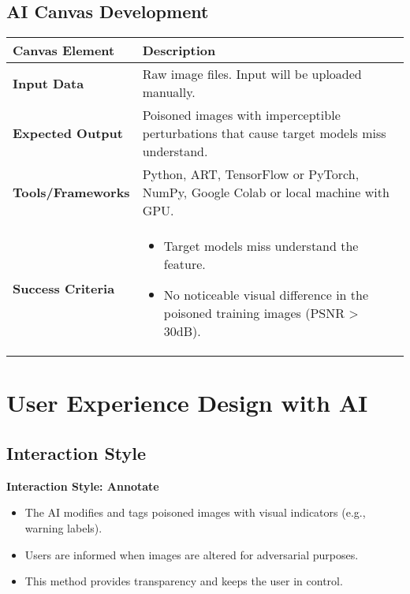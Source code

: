 \subsection{AI Canvas Development}

\begin{table}[h]
\centering
\begin{tabular}{|p{4cm}|p{10cm}|}
\hline
\textbf{Canvas Element} & \textbf{Description} \\
\hline
\textbf{Input Data} & Raw image files. Input will be uploaded manually. \\
\hline
\textbf{Expected Output} & Poisoned images with imperceptible perturbations that cause target models miss understand. \\
\hline
\textbf{Tools/Frameworks} & Python, ART, TensorFlow or PyTorch, NumPy, Google Colab or local machine with GPU. \\
\hline
\textbf{Success Criteria} & 
\begin{itemize}
    \item Target models miss understand the feature.
    \item No noticeable visual difference in the poisoned training images (PSNR > 30dB).
\end{itemize} \\
\hline
\end{tabular}
\end{table}

\section{User Experience Design with AI}
\label{section:user-experience-design-with-AI}


\subsection{Interaction Style}
\textbf{Interaction Style: Annotate}

\begin{itemize}
    \item The AI modifies and tags poisoned images with visual indicators (e.g., warning labels).
    \item Users are informed when images are altered for adversarial purposes.
    \item This method provides transparency and keeps the user in control.
\end{itemize}

